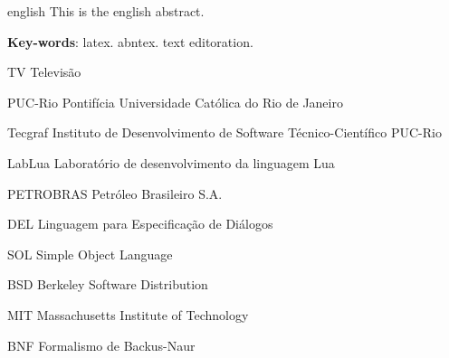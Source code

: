 \documentclass[
12pt, %
openright, %
oneside, %
a4paper, %
english, %
brazil, %
]{abntex2}
\begin{document}
\begin{resumo}[Abstract]
 \begin{otherlanguage*}{english}
   This is the english abstract.

   \vspace{\onelineskip}
 
   \noindent
   \textbf{Key-words}: latex. abntex. text editoration.
 \end{otherlanguage*}
\end{resumo}

\listoffigures*
\cleardoublepage

\listoftables*
\cleardoublepage

\begin{siglas}
  \item[TV] Televisão 
  \item[PUC-Rio] Pontifícia Universidade Católica do Rio de Janeiro
  \item[Tecgraf] Instituto de Desenvolvimento de Software Técnico-Científico PUC-Rio
  \item[LabLua] Laboratório de desenvolvimento da linguagem Lua
  \item[PETROBRAS]  Petróleo Brasileiro S.A. 
  \item[DEL] Linguagem para Especificação de Diálogos 
  \item[SOL] Simple Object Language
  \item[BSD] Berkeley Software Distribution 
  \item[MIT] Massachusetts Institute of Technology
  \item[BNF] Formalismo de Backus-Naur
\end{siglas}


\tableofcontents*
\cleardoublepage
\end{document}
